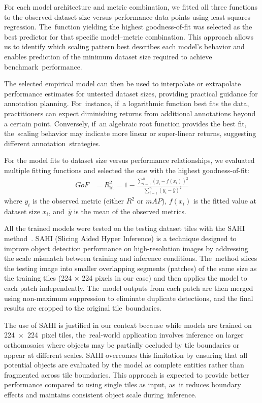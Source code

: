 \documentclass[12pt,a4paper,oneside]{report}
\begin{document}
For each model architecture and metric combination, we fitted all three functions 
to the observed dataset size versus performance data points using least squares 
regression. The~function yielding the highest goodness-of-fit was selected as the 
best predictor for that specific model--metric combination. This approach allows us 
to identify which scaling pattern best describes each model's behavior and enables 
prediction of the minimum dataset size required to achieve benchmark~performance.

The selected empirical model can then be used to interpolate or extrapolate 
performance estimates for untested dataset sizes, providing practical guidance 
for annotation planning. For~instance, if~a logarithmic function best fits the 
data, practitioners can expect diminishing returns from additional annotations 
beyond a certain point. Conversely, if~an algebraic root function provides the 
best fit, the~scaling behavior may indicate more linear or super-linear returns, 
suggesting different annotation~strategies.

For the model fits to dataset size versus performance relationships, we evaluated 
multiple fitting functions and selected the one with the highest goodness-of-fit:
\begin{align}
\text{$GoF$} &= R^2_{\text{fit}} = 1 - \frac{\sum_{i=1}^{n} (y_i - f(x_i))^2}{\sum_{i=1}^{n} (y_i - \bar{y})^2}
\end{align}
where $y_i$ is the observed metric (either $R^2$ or $mAP$), $f(x_i)$ is the 
fitted value at dataset size $x_i$, and~$\bar{y}$ is the mean of the observed 
metrics.

All the trained models were tested on the testing dataset tiles with the SAHI method~\cite{akyonSlicingAidedHyper2022}.
SAHI (Slicing Aided Hyper Inference) is a technique designed to improve object detection 
performance on high-resolution images by addressing the scale mismatch between training 
and inference conditions. The~method slices the testing image into smaller overlapping 
segments (patches) of the same size as the training tiles (224 × 224 pixels in our case) 
and then applies the model to each patch independently. The~model outputs from each 
patch are then merged using non-maximum suppression to eliminate duplicate detections, 
and the final results are cropped to the original tile~boundaries.

The use of SAHI is justified in our context because while models are trained on 
\mbox{224 × 224 pixel} tiles, the~real-world application involves inference on larger 
orthomosaics where objects may be partially occluded by tile boundaries or appear 
at different scales. SAHI overcomes this limitation by ensuring that all potential 
objects are evaluated by the model as complete entities rather than fragmented 
across tile boundaries. This approach is expected to provide better performance 
compared to using single tiles as input, as~it reduces boundary effects and 
maintains consistent object scale during~inference.
\end{document}

